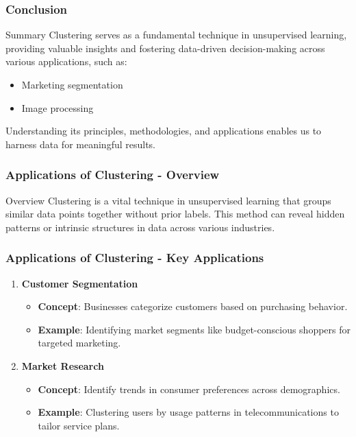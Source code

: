 \documentclass[aspectratio=169]{beamer}
\begin{document}
\begin{frame}[fragile]
    \frametitle{Conclusion}
    \begin{block}{Summary}
        Clustering serves as a fundamental technique in unsupervised learning, providing valuable insights and fostering data-driven decision-making across various applications, such as:
        \begin{itemize}
            \item Marketing segmentation
            \item Image processing
        \end{itemize}
        Understanding its principles, methodologies, and applications enables us to harness data for meaningful results.
    \end{block}
\end{frame}

\begin{frame}[fragile]
    \frametitle{Applications of Clustering - Overview}
    \begin{block}{Overview}
        Clustering is a vital technique in unsupervised learning that groups similar data points together without prior labels. This method can reveal hidden patterns or intrinsic structures in data across various industries.
    \end{block}
\end{frame}

\begin{frame}[fragile]
    \frametitle{Applications of Clustering - Key Applications}
    \begin{enumerate}
        \item \textbf{Customer Segmentation}
            \begin{itemize}
                \item \textbf{Concept}: Businesses categorize customers based on purchasing behavior.
                \item \textbf{Example}: Identifying market segments like budget-conscious shoppers for targeted marketing.
            \end{itemize}
        
        \item \textbf{Market Research}
            \begin{itemize}
                \item \textbf{Concept}: Identify trends in consumer preferences across demographics. 
                \item \textbf{Example}: Clustering users by usage patterns in telecommunications to tailor service plans.
            \end{itemize}
    \end{enumerate}
\end{frame}
\end{document}

